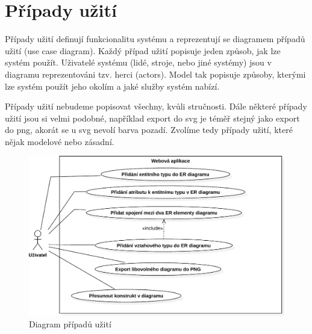\section{Případy užití}

Případy užití definují funkcionalitu systému a reprezentují se diagramem případů užití (use case diagram).
Každý případ užití popisuje jeden způsob, jak lze systém použít.
Uživatelé systému (lidé, stroje, nebo jiné systémy) jsou v diagramu reprezentováni tzv. herci (actors).
Model tak popisuje způsoby, kterými lze systém použít jeho okolím a jaké služby systém nabízí.~\cite[s.~65]{overgaard_usecases_2005}

Případy užití nebudeme popisovat všechny, kvůli stručnosti.
Dále některé případy užití jsou si velmi podobné, například export do \acrshort{svg} je téměř stejný jako export do \acrshort{png}, akorát se u \acrshort{svg} nevolí barva pozadí.
Zvolíme tedy případy užití, které nějak modelové nebo zásadní.

\begin{figure}[!htb]
  \centering
  \includegraphics[width=\maxwidth{0.7\textwidth}]{../img/diagrams/use-case-diagram.pdf}
  \caption{Diagram případů užití}
  \label{fig:use-case-diagram}
\end{figure}

\newcommand{\ucsub}[1]{\textbf{#1}}
\newcommand{\uc}[1]{\subsection*{#1}}
\def\ucstart{\ucsub{Počáteční stav}\\\indent}
\def\ucnormal{\ucsub{Běžný průběh}}
\def\ucerrors{\ucsub{Možné chyby}}
\def\ucend{\ucsub{Stav systému po dokončení}\\\indent}

